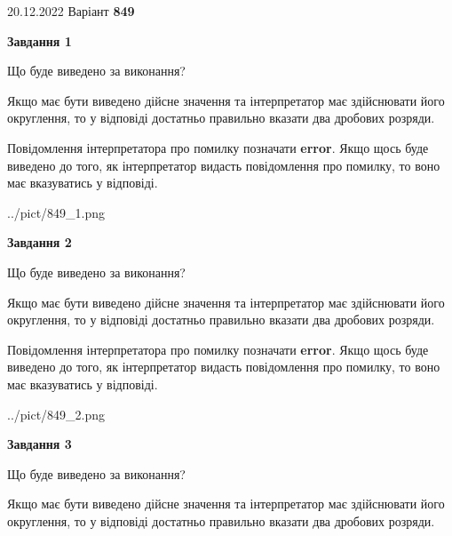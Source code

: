 \documentclass[12pt, ukrainian]{article}
\begin{document}
{20.12.2022 Варіант \No \textbf { 849 }\par}
{
\begin {Large}

{\begin {center}\textbf{Завдання 1}\end {center}}\par
Що буде виведено за виконання? \par

Якщо має бути виведено дійсне значення та інтерпретатор має здійснювати його округлення, 
то у відповіді достатньо правильно вказати два дробових розряди.

Повідомлення інтерпретатора про помилку позначати \textbf{error}.
Якщо щось буде виведено до того, як інтерпретатор видасть повідомлення про помилку, 
то воно має вказуватись у відповіді. \par

\begin{center}
	{../pict/849_1.png}
\end{center}
\newpage

{\begin {center}\textbf{Завдання 2}\end {center}}\par
Що буде виведено за виконання? \par

Якщо має бути виведено дійсне значення та інтерпретатор має здійснювати його округлення, 
то у відповіді достатньо правильно вказати два дробових розряди.

Повідомлення інтерпретатора про помилку позначати \textbf{error}.
Якщо щось буде виведено до того, як інтерпретатор видасть повідомлення про помилку, 
то воно має вказуватись у відповіді. \par

\begin{center}
	{../pict/849_2.png}
\end{center}
\newpage

{\begin {center}\textbf{Завдання 3}\end {center}}\par
Що буде виведено за виконання? \par

Якщо має бути виведено дійсне значення та інтерпретатор має здійснювати його округлення, 
то у відповіді достатньо правильно вказати два дробових розряди.


\end{Large}}
\end{document}
